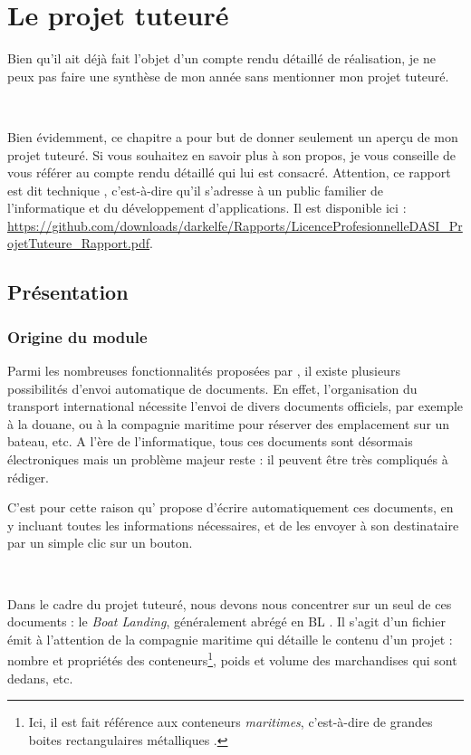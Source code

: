 \chapter{Le projet tuteuré}
Bien qu'il ait déjà fait l'objet d'un compte rendu détaillé de réalisation, je ne peux pas faire une synthèse de mon année sans mentionner mon projet tuteuré.

~

Bien évidemment, ce chapitre a pour but de donner seulement un aperçu de mon projet tuteuré. Si vous souhaitez en savoir plus à son propos, je vous conseille de vous référer au compte rendu détaillé qui lui est consacré. Attention, ce rapport est dit \og technique \fg, c'est-à-dire qu'il s'adresse à un public familier de l'informatique et du développement d'applications. Il est disponible ici : \url{https://github.com/downloads/darkelfe/Rapports/LicenceProfesionnelleDASI_ProjetTuteure_Rapport.pdf}.

\section{Présentation}
\subsection{Origine du module}
Parmi les nombreuses fonctionnalités proposées par \integrale, il existe plusieurs possibilités d'envoi automatique de documents. En effet, l'organisation du transport international nécessite l'envoi de divers documents officiels, par exemple à la douane, ou à la compagnie maritime pour réserver des emplacement sur un bateau, etc. A l'ère de l'informatique, tous ces documents sont désormais électroniques mais un problème majeur reste : il peuvent être très compliqués à rédiger.

C'est pour cette raison qu'\integrale{} propose d'écrire automatiquement ces documents, en y incluant toutes les informations nécessaires, et de les envoyer à son destinataire par un simple clic sur un bouton.

~

Dans le cadre du projet tuteuré, nous devons nous concentrer sur un seul de ces documents : le \emph{Boat Landing}, généralement abrégé en
\og BL \fg. Il s'agit d'un fichier émit à l'attention de la compagnie maritime qui détaille le contenu d'un projet : nombre et propriétés des conteneurs\footnote{Ici, il est fait référence aux conteneurs \emph{maritimes}, c'est-à-dire de \og grandes boites rectangulaires métalliques \fg.}, poids et volume des marchandises qui sont dedans, etc.

